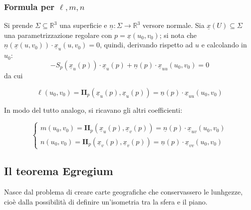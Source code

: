 \documentclass[12pt]{scrartcl}
\theoremstyle{style}
\newenvironment{boxenv}[1][]{
    \begin{eqbox}[#1]
    }{
   \end{eqbox}
}
\numberwithin{equation}{subsection}
\begin{document}
\subsubsection{Formula per $\ell ,m,n$}
Si prende $\Sigma \subseteq \mathbb{R}^3$ una superficie e $\underline{n}: \Sigma \to \mathbb{R}^3$ versore normale.
Sia $\underline{x}(U) \subseteq \Sigma$ una parametrizzazione regolare con $p = \underline{x}(u_0,v_0)$; si nota che $\underline{n}(\underline{x}(u,v_0)) \cdot \underline{x}_u(u,v_0) = 0 $, quindi, derivando rispetto ad $u$ e calcolando in $u_0$:
\[
-S_p (\underline{x}_u (p)) \cdot \underline{x}_u (p) + \underline{n}(p) \cdot \underline{x}_{uu} (u_0,v_0) = 0 
\] 
da cui
\begin{boxenv}[]
\begin{equation}
	\ell (u_0,v_0) = \mathbf{I I} _p (\underline{x}_u(p), \underline{x}_u(p)) = \underline{n}(p) \cdot \underline{x}_{u u } (u_0,v_0)
\end{equation}
\end{boxenv}
\noindent In modo del tutto analogo, si ricavano gli altri coefficienti:
\begin{boxenv}[]
\begin{equation}
	\begin{cases}
		m(u_0,v_0) = \mathbf{II} _p (\underline{x}_u(p),\underline{x}_v(p)) = \underline{n}(p) \cdot \underline{x}_{uv} (u_0,v_0)\\
		n (u_0,v_0) = \mathbf{I I} _p (\underline{x}_v(p),\underline{x}_v(p)) = \underline{n}(p) \cdot \underline{x}_{v v } (u_0,v_0)
	\end{cases}
\end{equation}
\end{boxenv}


\subsection{Il teorema Egregium}

Nasce dal problema di creare carte geografiche che conservassero le lunhgezze, cio\`e dalla possibilit\`a di definire un'isometria tra la sfera e il piano.
\end{document}
